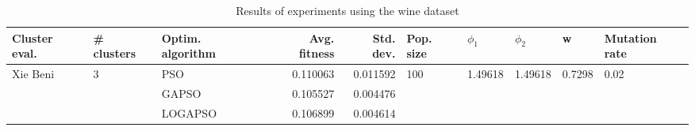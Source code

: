 \begin{table}
\centering
\caption{Results of experiments using the wine dataset}
\begin{tabular}{lllrrlllll}
\toprule
            Cluster eval. &        \# clusters & Optim. algorithm &  Avg. fitness &  Std. dev. &            Pop. size &               $\phi_{1}$ &               $\phi_{2}$ &                       w &         Mutation rate \\
\midrule
\multirow{3}{*}{Xie Beni} & \multirow{3}{*}{3} &              PSO &      0.110063 &   0.011592 & \multirow{3}{*}{100} & \multirow{3}{*}{1.49618} & \multirow{3}{*}{1.49618} & \multirow{3}{*}{0.7298} & \multirow{3}{*}{0.02} \\
                          &                    &            GAPSO &      0.105527 &   0.004476 &                      &                          &                          &                         &                       \\
                          &                    &          LOGAPSO &      0.106899 &   0.004614 &                      &                          &                          &                         &                       \\
\bottomrule
\end{tabular}
\end{table}
